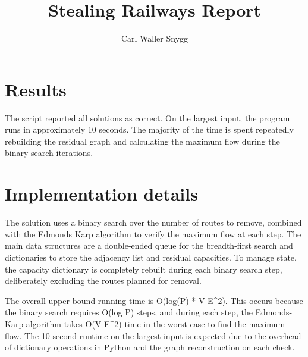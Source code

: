 \documentclass{article}
\title{Stealing Railways Report}
\author{Carl Waller Snygg}
\begin{document}
  \maketitle

  \section{Results}
  
  The script reported all solutions as correct. On the largest input, the program runs in approximately 10 seconds. The majority of the time is spent repeatedly rebuilding the residual graph and calculating the maximum flow during the binary search iterations.

  \section{Implementation details}
  
  The solution uses a binary search over the number of routes to remove, combined with the Edmonds Karp algorithm to verify the maximum flow at each step. The main data structures are a double-ended queue for the breadth-first search and dictionaries to store the adjacency list and residual capacities. To manage state, the capacity dictionary is completely rebuilt during each binary search step, deliberately excluding the routes planned for removal. 
  
  The overall upper bound running time is O(log(P) * V E^2). This occurs because the binary search requires O(log P) steps, and during each step, the Edmonds-Karp algorithm takes O(V E^2) time in the worst case to find the maximum flow. The 10-second runtime on the largest input is expected due to the overhead of dictionary operations in Python and the graph reconstruction on each check.
\end{document}
